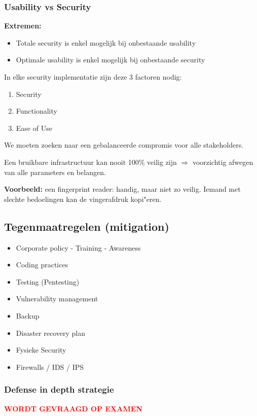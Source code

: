 \documentclass{article}
\newcommand{\bold}[1]{\textbf{#1}}
\begin{document}
\subsubsection{Usability vs Security}
\bold{Extremen:}

\begin{itemize}
    \item Totale security is enkel mogelijk bij onbestaande usability
    \item Optimale usability is enkel mogelijk bij onbestaande security
\end{itemize}

In elke security implementatie zijn deze 3 factoren nodig:

\begin{enumerate}
    \item Security 
    \item Functionality
    \item Ease of Use
\end{enumerate}

We moeten zoeken naar een gebalanceerde compromis voor alle stakeholders.

Een bruikbare infrastructuur kan nooit 100\% veilig zijn $\Rightarrow$ voorzichtig afwegen van alle parameters en belangen.

\bold{Voorbeeld: } een fingerprint reader: handig, maar niet zo veilig. Iemand met slechte bedoelingen kan de vingerafdruk kopi"eren.

\subsection{Tegenmaatregelen (mitigation)}

\begin{itemize}
    \item Corporate policy  - Training  - Awareness
    \item Coding practices
    \item Testing (Pentesting)
    \item Vulnerability management
    \item Backup
    \item Disaster recovery plan
    \item Fysieke Security
    \item Firewalls / IDS / IPS
\end{itemize}

\subsubsection{Defense in depth strategie}
\textcolor{red}{\bold{WORDT GEVRAAGD OP EXAMEN}}
\end{document}
